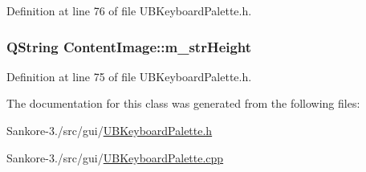 Definition at line 76 of file U\-B\-Keyboard\-Palette.\-h.

\hypertarget{class_content_image_a4b6af2cc0e1d7cb87f0f3976b2cd2828}{
\subsubsection[{m\-\_\-str\-Height}]{\setlength{\rightskip}{0pt plus 5cm}Q\-String Content\-Image\-::m\-\_\-str\-Height}}\label{d6/d91/class_content_image_a4b6af2cc0e1d7cb87f0f3976b2cd2828}


Definition at line 75 of file U\-B\-Keyboard\-Palette.\-h.



The documentation for this class was generated from the following files\-:\begin{DoxyCompactItemize}
\item 
Sankore-\/3./src/gui/\hyperlink{_u_b_keyboard_palette_8h}{U\-B\-Keyboard\-Palette.\-h}\item 
Sankore-\/3./src/gui/\hyperlink{_u_b_keyboard_palette_8cpp}{U\-B\-Keyboard\-Palette.\-cpp}\end{DoxyCompactItemize}
